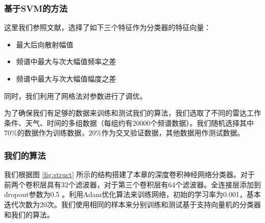 \subsubsection{基于SVM的方法}
这里我们参照文献\cite{jin2012svm}，选择了如下三个特征作为分类器的特征向量：
\begin{itemize}
	\item 最大后向散射幅值
	\item 频谱中最大与次大幅值频率之差
	\item 频谱中最大与次大幅值幅度之差
\end{itemize}
同时，我们利用了网格法对参数进行了调优。

为了确保我们有足够的数据来训练和测试我们的算法，我们选取了不同的雷达工作条件、天气、时间的多组数据（每组约有20000个频谱数据）。我们随机选择其中$70\%$的数据作为训练数据，$20\%$作为交叉验证数据，其他数据用作测试数据。

\subsubsection{我们的算法}
我们根据图 \ref{fig:struct} 所示的结构搭建了本章的深度卷积神经网络分类器。对于前两个卷积层具有32个滤波器，对于第三个卷积层有64个滤波器。全连接层添加到dropout参数为0.5 。利用Adam优化算法来训练网络，初始的学习率为0.001，基本迭代次数为20次。我们使用相同的样本来分别训练和测试基于支持向量机的分类器和我们的算法。

